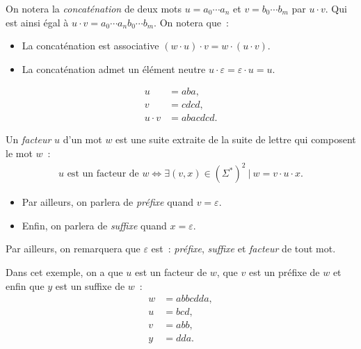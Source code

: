 \begin{definition}
  On notera la \textit{concaténation} de deux mots \(u = a_0 \cdots a_n\) et 
  \(v = b_0 \cdots b_m\) par \(u \cdot v\). Qui est ainsi égal à \(u \cdot v =
  a_0 \cdots a_n b_0 \cdots b_m\). On notera que~:

  \vphantom{}

  \begin{itemize}
    \item[\bullet] La concaténation est associative \((w \cdot u) \cdot v = w
      \cdot (u \cdot v)\).
    \item[\bullet] La concaténation admet un élément neutre \(u \cdot 
      \varepsilon = \varepsilon \cdot u = u\).
  \end{itemize}
\end{definition}

\begin{example}
  \vspace{-\baselineskip}
  \begin{align*}
    u &= aba, \\
    v &= cdcd, \\
    u \cdot v &= abacdcd.
  \end{align*}
\end{example}

\begin{definition}
  Un \textit{facteur} \(u\) d'un mot \(w\) est une suite extraite de la suite
  de lettre qui composent le mot \(w\)~:
  \begin{align*}
    u \text{ est un facteur de } w \Longleftrightarrow \exists (v, x) \in
    (\Sigma ^ *)^2 ~|~ w = v \cdot u \cdot x.
  \end{align*} 

  \begin{itemize}
    \item[\bullet] Par ailleurs, on parlera de \textit{préfixe} quand \(v = 
      \varepsilon\).
    \item[\bullet] Enfin, on parlera de \textit{suffixe} quand \(x =
      \varepsilon\).
  \end{itemize}

  \vphantom{}

  Par ailleurs, on remarquera que \(\varepsilon\) est~: \textit{préfixe}, 
  \textit{suffixe} et \textit{facteur} de tout mot.
\end{definition}

\begin{example}
  Dans cet exemple, on a que \(u\) est un facteur de \(w\), que \(v\) est un
  préfixe de \(w\) et enfin que \(y\) est un suffixe de \(w\)~:
  \begin{align*}
    w &= abbcdda, \\
    u &= bcd, \\
    v &= abb, \\
    y &= dda.
  \end{align*}
\end{example}

